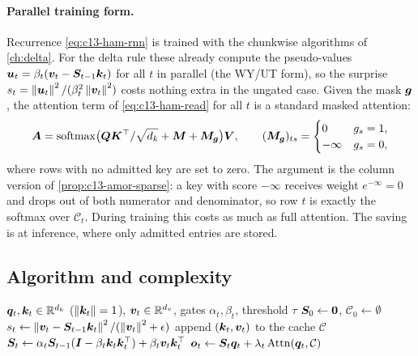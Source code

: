 \paragraph{Parallel training form.} Recurrence \eqref{eq:c13-ham-rnn} is trained with the chunkwise
algorithms of \cref{ch:delta}. For the delta rule these already compute the pseudo-values
$\bm{u}_t=\beta_t(\bm{v}_t-\bm{S}_{t-1}\bm{k}_t)$ for all $t$ in parallel (the WY/UT form), so the surprise
$s_t=\left\lVert \bm{u}_t\right\rVert^2/(\beta_t^2\left\lVert \bm{v}_t\right\rVert^2)$ costs nothing extra in the ungated case. Given the mask
$\bm{g}$, the attention term of \eqref{eq:c13-ham-read} for all $t$ is a standard masked attention:
\begin{equation}\label{eq:c13-ham-parallel}
  \bm{A} = \operatorname{softmax}\bigl(\bm{Q}\bm{K}^{\top}/\sqrt{d_k}+\bm{M}+\bm{M}_{\bm{g}}\bigr)\bm{V},\qquad
  (\bm{M}_{\bm{g}})_{ts}=\begin{cases}0 & g_s=1,\\ -\infty & g_s=0,\end{cases}
\end{equation}
where rows with no admitted key are set to zero. The argument is the column version of
\cref{prop:c13-amor-sparse}: a key with score $-\infty$ receives weight $e^{-\infty}=0$ and drops out of
both numerator and denominator, so row $t$ is exactly the softmax over $\mathcal{C}_t$. During training
this costs as much as full attention. The saving is at inference, where only admitted entries are stored.

\subsection{Algorithm and complexity}

\begin{algorithm}[t]
\caption{HAM-style layer, recurrent form (our formalization)}\label{alg:c13-ham}
\begin{algorithmic}[1]
\Require $\bm{q}_t,\bm{k}_t\in\mathbb{R}^{d_k}$ ($\left\lVert \bm{k}_t\right\rVert=1$), $\bm{v}_t\in\mathbb{R}^{d_v}$, gates $\alpha_t,\beta_t$, threshold $\tau$
\State $\bm{S}_0\gets\bm{0}$, $\mathcal{C}_0\gets\emptyset$
  \State $s_t\gets\left\lVert \bm{v}_t-\bm{S}_{t-1}\bm{k}_t\right\rVert^2/(\left\lVert \bm{v}_t\right\rVert^2+\epsilon)$ 
   
    \State append $(\bm{k}_t,\bm{v}_t)$ to the cache $\mathcal{C}$
  \EndIf
  \State $\bm{S}_t\gets\alpha_t\bm{S}_{t-1}(\bm{I}-\beta_t\bm{k}_t\bm{k}_t^{\top})+\beta_t\bm{v}_t\bm{k}_t^{\top}$ 
  \State $\bm{o}_t\gets\bm{S}_t\bm{q}_t+\lambda_t\,\mathrm{Attn}(\bm{q}_t,\mathcal{C})$
\EndFor
\end{algorithmic}
\end{algorithm}

